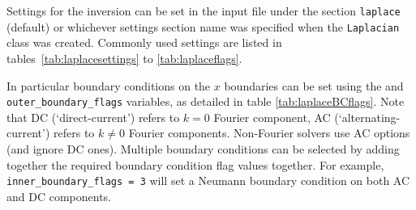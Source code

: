 \documentclass[12pt]{article}
\newcommand{\code}[1]{\texttt{#1}}
\begin{document}
Settings for the inversion can be set in the input file under the section
\code{laplace} (default) or whichever settings section name was specified when
the
%
\lstinline!Laplacian!
%
 class was created.  Commonly used settings are listed in
 tables~\ref{tab:laplacesettings} to \ref{tab:laplaceflags}.

In particular boundary conditions on the $x$ boundaries can be set using the
 and \code{outer\_boundary\_flags} variables, as
detailed in table \ref{tab:laplaceBCflags}.  Note that DC (`direct-current')
refers to $k = 0$ Fourier component, AC (`alternating-current') refers to $k
\neq 0$ Fourier components.  Non-Fourier solvers use AC options (and ignore DC
ones).  Multiple boundary conditions can be selected by adding together the
required boundary condition flag values together.  For example,
%
\lstinline!inner_boundary_flags = 3!
%
 will set a Neumann boundary condition on both AC and DC components.
\end{document}
